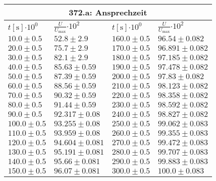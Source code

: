 \documentclass{article}
\begin{document}
\begin{tabular}{|p{3cm}|p{3cm}||p{3cm}|p{3cm}|}
\hline
\multicolumn{4}{|c|}{372.a: Ansprechzeit}\\
\hline
$t[\textrm{s}]$$\cdot 10^{0}$&$\frac{U}{U_{\textrm{max}}}$$\cdot 10^{2}$&$t[\textrm{s}]$$\cdot 10^{0}$&$\frac{U}{U_{\textrm{max}}}$$\cdot 10^{2}$\\
\hline
$10.0\pm0.5$&$52.8\pm 2.9$&$160.0\pm0.5$&$96.54\pm 0.082$\\
$20.0\pm0.5$&$75.7\pm 2.9$&$170.0\pm0.5$&$96.891\pm 0.082$\\
$30.0\pm0.5$&$82.1\pm 2.9$&$180.0\pm0.5$&$97.185\pm 0.082$\\
$40.0\pm0.5$&$85.63\pm 0.59$&$190.0\pm0.5$&$97.478\pm 0.082$\\
$50.0\pm0.5$&$87.39\pm 0.59$&$200.0\pm0.5$&$97.83\pm 0.082$\\
$60.0\pm0.5$&$88.56\pm 0.59$&$210.0\pm0.5$&$98.123\pm 0.082$\\
$70.0\pm0.5$&$90.32\pm 0.59$&$220.0\pm0.5$&$98.358\pm 0.082$\\
$80.0\pm0.5$&$91.44\pm 0.59$&$230.0\pm0.5$&$98.592\pm 0.082$\\
$90.0\pm0.5$&$92.317\pm 0.08$&$240.0\pm0.5$&$98.827\pm 0.082$\\
$100.0\pm0.5$&$93.255\pm 0.08$&$250.0\pm0.5$&$99.062\pm 0.083$\\
$110.0\pm0.5$&$93.959\pm 0.08$&$260.0\pm0.5$&$99.355\pm 0.083$\\
$120.0\pm0.5$&$94.604\pm 0.081$&$270.0\pm0.5$&$99.472\pm 0.083$\\
$130.0\pm0.5$&$95.191\pm 0.081$&$280.0\pm0.5$&$99.707\pm 0.083$\\
$140.0\pm0.5$&$95.66\pm 0.081$&$290.0\pm0.5$&$99.883\pm 0.083$\\
$150.0\pm0.5$&$96.07\pm 0.081$&$300.0\pm0.5$&$100.0\pm 0.083$\\
\hline
\end{tabular}
\end{document}
